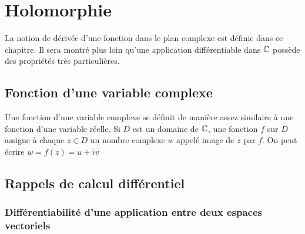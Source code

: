 \chapter{Holomorphie}
La notion de dérivée d'une fonction dans le plan complexe est définie dans ce chapitre. Il sera montré plus loin qu'une application différentiable dans $\mathbb{C}$ possède des propriétés très particulières.

\section{Fonction d'une variable complexe}
Une fonction d'une variable complexe se définit de manière assez similaire à une fonction d'une variable réelle. Si $D$ est un domaine de $\mathbb{C}$, une fonction $f$ sur $D$ assigne à chaque $z \in D$ un nombre complexe $w$ appelé image de $z$ par $f$. On peut écrire $w = f(z) = u+iv$

\section{Rappels de calcul différentiel}

\subsection{Différentiabilité d'une application entre deux espaces vectoriels}

